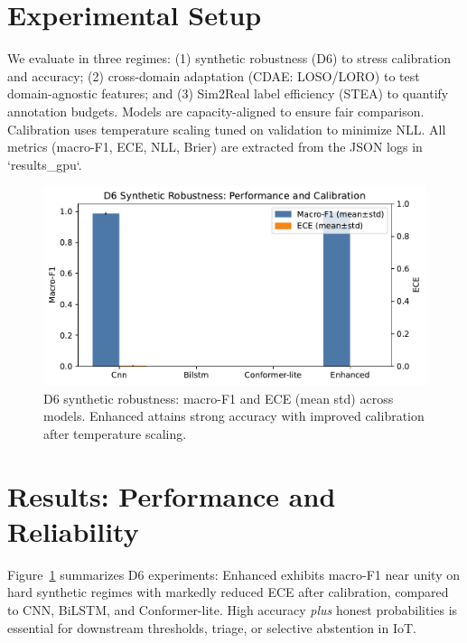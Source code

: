 \documentclass[journal]{IEEEtran}
\begin{document}
\section{Experimental Setup}
We evaluate in three regimes: (1) synthetic robustness (D6) to stress calibration and accuracy; (2) cross-domain adaptation (CDAE: LOSO/LORO) to test domain-agnostic features; and (3) Sim2Real label efficiency (STEA) to quantify annotation budgets. Models are capacity-aligned to ensure fair comparison. Calibration uses temperature scaling tuned on validation to minimize NLL. All metrics (macro-F1, ECE, NLL, Brier) are extracted from the JSON logs in `results\_gpu`.

\begin{figure}[t]
\centering
\includegraphics[width=\columnwidth]{plots/d6_calibration_summary.pdf}
\caption{D6 synthetic robustness: macro-F1 and ECE (mean\,\textpm\,std) across models. Enhanced attains strong accuracy with improved calibration after temperature scaling.}
\label{fig:d6_cal}
\end{figure}

\section{Results: Performance and Reliability}
Figure~\ref{fig:d6_cal} summarizes D6 experiments: Enhanced exhibits macro-F1 near unity on hard synthetic regimes with markedly reduced ECE after calibration, compared to CNN, BiLSTM, and Conformer-lite. High accuracy \emph{plus} honest probabilities is essential for downstream thresholds, triage, or selective abstention in IoT.
\end{document}

